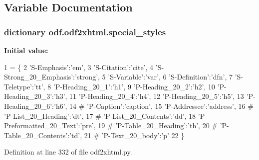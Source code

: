 \subsection{Variable Documentation}
\hypertarget{namespaceodf_1_1odf2xhtml_a45771f201b4cf26ab88c538306808fd7}{
\subsubsection[{special\+\_\+styles}]{\setlength{\rightskip}{0pt plus 5cm}dictionary odf.\+odf2xhtml.\+special\+\_\+styles}}\label{namespaceodf_1_1odf2xhtml_a45771f201b4cf26ab88c538306808fd7}
{\bfseries Initial value\+:}
\begin{DoxyCode}
1 = \{
2    \textcolor{stringliteral}{'S-Emphasis'}:\textcolor{stringliteral}{'em'},
3    \textcolor{stringliteral}{'S-Citation'}:\textcolor{stringliteral}{'cite'},
4    \textcolor{stringliteral}{'S-Strong\_20\_Emphasis'}:\textcolor{stringliteral}{'strong'},
5    \textcolor{stringliteral}{'S-Variable'}:\textcolor{stringliteral}{'var'},
6    \textcolor{stringliteral}{'S-Definition'}:\textcolor{stringliteral}{'dfn'},
7    \textcolor{stringliteral}{'S-Teletype'}:\textcolor{stringliteral}{'tt'},
8    \textcolor{stringliteral}{'P-Heading\_20\_1'}:\textcolor{stringliteral}{'h1'},
9    \textcolor{stringliteral}{'P-Heading\_20\_2'}:\textcolor{stringliteral}{'h2'},
10    \textcolor{stringliteral}{'P-Heading\_20\_3'}:\textcolor{stringliteral}{'h3'},
11    \textcolor{stringliteral}{'P-Heading\_20\_4'}:\textcolor{stringliteral}{'h4'},
12    \textcolor{stringliteral}{'P-Heading\_20\_5'}:\textcolor{stringliteral}{'h5'},
13    \textcolor{stringliteral}{'P-Heading\_20\_6'}:\textcolor{stringliteral}{'h6'},
14 \textcolor{comment}{#  'P-Caption':'caption',}
15    \textcolor{stringliteral}{'P-Addressee'}:\textcolor{stringliteral}{'address'},
16 \textcolor{comment}{#  'P-List\_20\_Heading':'dt',}
17 \textcolor{comment}{#  'P-List\_20\_Contents':'dd',}
18    \textcolor{stringliteral}{'P-Preformatted\_20\_Text'}:\textcolor{stringliteral}{'pre'},
19 \textcolor{comment}{#  'P-Table\_20\_Heading':'th',}
20 \textcolor{comment}{#  'P-Table\_20\_Contents':'td',}
21 \textcolor{comment}{#  'P-Text\_20\_body':'p'}
22 \}
\end{DoxyCode}


Definition at line 332 of file odf2xhtml.\+py.

